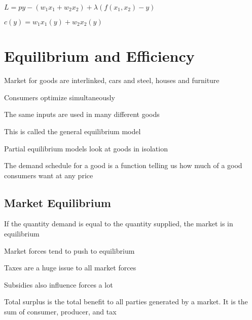 \documentclass[12pt]{article}
\begin{document}
$L = py - (w_{1}x_{1} + w_{2}x_{2}) + \lambda(f(x_{1}, x_{2}) - y)$

$c(y) = w_{1}x_{1}(y) + w_{2}x_{2}(y)$

\newpage
\section{Equilibrium and Efficiency}

Market for goods are interlinked, cars and steel, houses and furniture

Consumers optimize simultaneously

The same inputs are used in many different goods

This is called the general equilibrium model

Partial equilibrium models look at goods in isolation

The demand schedule for a good is a function telling us how much of a good consumers want at any price 

\subsection{Market Equilibrium}

If the quantity demand is equal to the quantity supplied, the market is in equilibrium

Market forces tend to push to equilibrium

Taxes are a huge issue to all market forces

Subsidies also influence forces a lot

Total surplus is the total benefit to all parties generated by a market. It is the sum of consumer, producer, and tax
\end{document}
